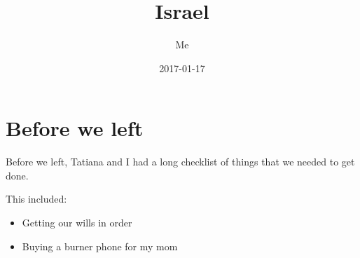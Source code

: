 \documentclass{article}
\title{Israel}
\author{Me}
\date{2017-01-17}
\begin{document}
\maketitle

\section{Before we left}
Before we left, Tatiana and I had a long checklist
of things that we needed to get done.

This included:
\begin{itemize}
    \item Getting our wills in order
    \item Buying a burner phone for my mom
\end{itemize}
\end{document}
